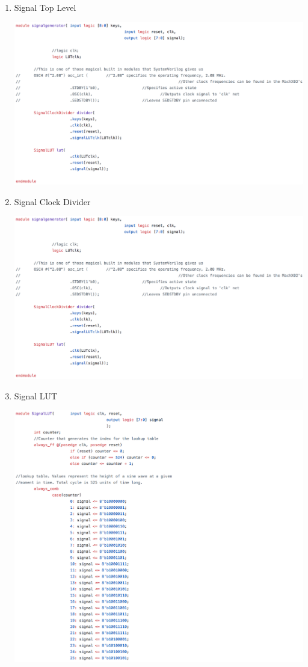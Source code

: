 \documentclass[a4paper]{article}
\begin{document}
\begin{enumerate}
\item Signal Top Level

\includegraphics[width=6 in]{./Images/Archive/9-SignalTopLevel.png}

\item Signal Clock Divider

\includegraphics[width=6 in]{./Images/Archive/9-SignalTopLevel.png}


\item Signal LUT

\includegraphics[width=6 in]{./Images/Archive/11-SignalLUT.png}


\end{enumerate}
\end{document}
